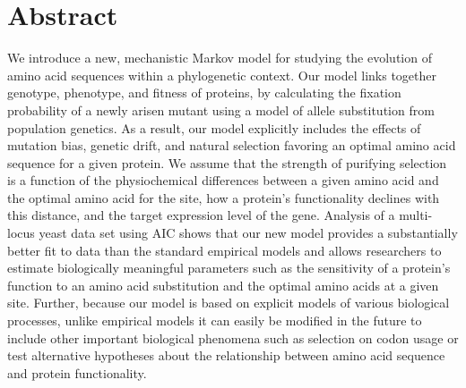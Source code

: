 \section{Abstract}
We introduce a new, mechanistic Markov model for studying the evolution of amino acid sequences within a phylogenetic context.
Our model links together genotype, phenotype, and fitness of proteins, by calculating the fixation probability of a newly arisen mutant using a model of allele substitution from population genetics. 
As a result, our model explicitly includes the effects of mutation bias, genetic drift, and natural selection favoring an optimal amino acid sequence for a given protein.
We assume that the strength of purifying selection is a function of the physiochemical differences between a given amino acid and the optimal amino acid for the site, how a protein's functionality declines with this distance, and the target expression level of the gene.
Analysis of a multi-locus yeast data set using AIC shows that our new model provides a substantially better fit to data than the standard empirical models and allows researchers to estimate biologically meaningful parameters such as the sensitivity of a protein's function to an amino acid substitution and the optimal amino acids at a given site.
Further, because our model is based on explicit models of various biological processes, unlike empirical models it can easily be modified in the future to include other important biological phenomena such as selection on codon usage or test alternative hypotheses about the relationship between amino acid sequence and protein functionality.
